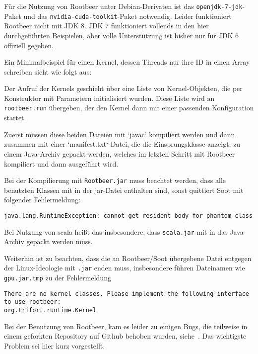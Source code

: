 Für die Nutzung von Rootbeer unter Debian-Derivaten ist das \texttt{openjdk-7-jdk}-Paket und das \texttt{nvidia-cuda-toolkit}-Paket notwendig. Leider funktioniert Rootbeer nicht mit JDK 8. JDK 7 funktioniert vollends in den hier durchgeführten Beispielen, aber volle Unterstützung ist bisher nur für JDK 6 offiziell gegeben\cite{rootbeerjdk6}.

Ein Minimalbeispiel für einen Kernel, dessen Threads nur ihre ID in einen Array schreiben sieht wie folgt aus:

Der Aufruf der Kernels geschieht über eine Liste von Kernel-Objekten, die per Konstruktor mit Parametern initialisiert wurden. Diese Liste wird an \texttt{rootbeer.run} übergeben, der den Kernel dann mit einer passenden Konfiguration startet.

Zuerst müssen diese beiden Dateien mit `javac` kompiliert werden und dann zusammen mit einer `manifest.txt`-Datei, die die Einsprungsklasse anzeigt, zu einem Java-Archiv gepackt werden, welches im letzten Schritt mit Rootbeer kompiliert und dann ausgeführt wird.

Bei der Kompilierung mit \texttt{Rootbeer.jar} muss beachtet werden, dass alle benutzten Klassen mit in der jar-Datei enthalten sind, sonst quittiert Soot mit folgender Fehlermeldung:
\begin{lstlisting}
java.lang.RuntimeException: cannot get resident body for phantom class
\end{lstlisting}\vspace{-1.5\baselineskip}
Bei Nutzung von scala heißt das insbesondere, dass \texttt{scala.jar} mit in das Java-Archiv gepackt werden muss.

Weiterhin ist zu beachten, dass die an Rootbeer/Soot übergebene Datei entgegen der Linux-Ideologie mit \texttt{.jar} enden muss, insbesondere führen Dateinamen wie \texttt{gpu.jar.tmp} zu der Fehlermeldung
\begin{lstlisting}
There are no kernel classes. Please implement the following interface to use rootbeer:
org.trifort.runtime.Kernel
\end{lstlisting}



Bei der Benutzung von Rootbeer, kam es leider zu einigen Bugs, die teilweise in einem geforkten Repository auf Github behoben wurden, siehe~\cite{ownrootbeerfork}.
Das wichtigste Problem sei hier kurz vorgestellt.

